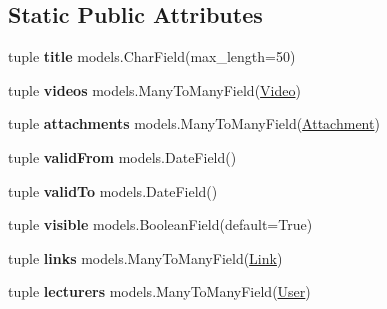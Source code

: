 \subsection*{Static Public Attributes}
\begin{DoxyCompactItemize}
\item 
\hypertarget{class_learn_1_1models_1_1_lecture_ab3b7fb800f000c80f1110480c7d35933}{tuple {\bfseries title} models.\-Char\-Field(max\-\_\-length=50)}\label{class_learn_1_1models_1_1_lecture_ab3b7fb800f000c80f1110480c7d35933}

\item 
\hypertarget{class_learn_1_1models_1_1_lecture_ac19083c89180f81e3f20147b2107159c}{tuple {\bfseries videos} models.\-Many\-To\-Many\-Field(\hyperlink{class_learn_1_1models_1_1_video}{Video})}\label{class_learn_1_1models_1_1_lecture_ac19083c89180f81e3f20147b2107159c}

\item 
\hypertarget{class_learn_1_1models_1_1_lecture_af75889e8ad3a0a94e9391e61542be336}{tuple {\bfseries attachments} models.\-Many\-To\-Many\-Field(\hyperlink{class_learn_1_1models_1_1_attachment}{Attachment})}\label{class_learn_1_1models_1_1_lecture_af75889e8ad3a0a94e9391e61542be336}

\item 
\hypertarget{class_learn_1_1models_1_1_lecture_a69edbeec19d878a65e0d872ec116b78b}{tuple {\bfseries valid\-From} models.\-Date\-Field()}\label{class_learn_1_1models_1_1_lecture_a69edbeec19d878a65e0d872ec116b78b}

\item 
\hypertarget{class_learn_1_1models_1_1_lecture_ae466aaba7429a70e009fcea6e94e3f02}{tuple {\bfseries valid\-To} models.\-Date\-Field()}\label{class_learn_1_1models_1_1_lecture_ae466aaba7429a70e009fcea6e94e3f02}

\item 
\hypertarget{class_learn_1_1models_1_1_lecture_ae895aa3e48283081eb38066335feecd6}{tuple {\bfseries visible} models.\-Boolean\-Field(default=True)}\label{class_learn_1_1models_1_1_lecture_ae895aa3e48283081eb38066335feecd6}

\item 
\hypertarget{class_learn_1_1models_1_1_lecture_a6dcf95b7e3c94bc30a5d131ffc80dc30}{tuple {\bfseries links} models.\-Many\-To\-Many\-Field(\hyperlink{class_learn_1_1models_1_1_link}{Link})}\label{class_learn_1_1models_1_1_lecture_a6dcf95b7e3c94bc30a5d131ffc80dc30}

\item 
\hypertarget{class_learn_1_1models_1_1_lecture_ac7c762a2effa5f31cbc8e3cda5ab31f8}{tuple {\bfseries lecturers} models.\-Many\-To\-Many\-Field(\hyperlink{class_learn_1_1models_1_1_user}{User})}\label{class_learn_1_1models_1_1_lecture_ac7c762a2effa5f31cbc8e3cda5ab31f8}

\end{DoxyCompactItemize}
